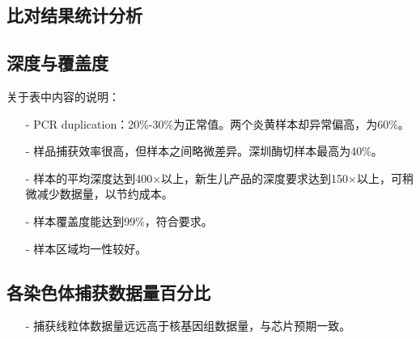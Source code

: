 \documentclass[a4paper,11pt]{article}
\theoremstyle{mytheor}
\begin{document}
\begin{CJK*}{UTF8}{gbsn}
\section{比对结果统计分析}
\subsection{深度与覆盖度}

\fontsize{10}{12} \selectfont
关于表中内容的说明：
\begin{itemize}\setlength{\itemsep}{0pt}
\item[-] PCR duplication：20\%-30\%为正常值。两个炎黄样本却异常偏高，为60\%。
\item[-] 样品捕获效率很高，但样本之间略微差异。深圳酶切样本最高为40\%。
\item[-] 样本的平均深度达到400×以上，新生儿产品的深度要求达到150×以上，可稍微减少数据量，以节约成本。
\item[-] 样本覆盖度能达到99\%，符合要求。
\item[-] 样本区域均一性较好。
\end{itemize}

\subsection{各染色体捕获数据量百分比}

\fontsize{10}{12} \selectfont
\begin{itemize}\setlength{\itemsep}{0pt} 
\item[-] 捕获线粒体数据量远远高于核基因组数据量，与芯片预期一致。
\end{itemize}


\end{CJK*}
\end{document}
